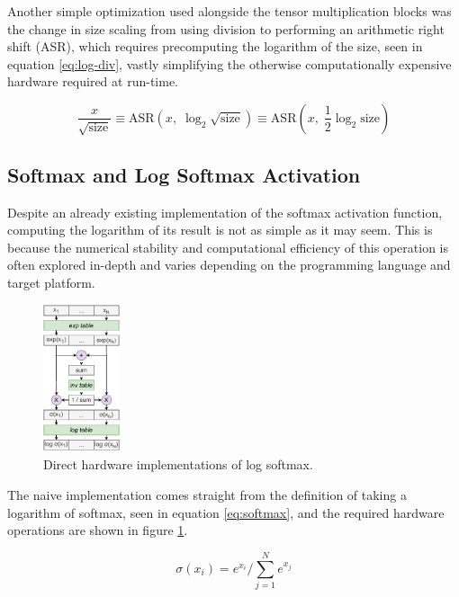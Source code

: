 Another simple optimization used alongside the tensor multiplication blocks was the change in size scaling from using division to performing an arithmetic right shift (ASR), which requires precomputing the logarithm of the size, seen in equation \ref{eq:log-div}, vastly simplifying the otherwise computationally expensive hardware required at run-time.

\begin{equation}\label{eq:log-div}
  \frac{x}{\sqrt{\text{size}}} \equiv \text{ASR}(x,\; \log_2 \sqrt{\text{size}}) \equiv \text{ASR}(x,\; \frac{1}{2}\log_2 \text{size})
\end{equation}


\subsection{Softmax and Log Softmax Activation}
Despite an already existing \hlsml implementation of the softmax activation function, computing the logarithm of its result is not as simple as it may seem. This is because the numerical stability and computational efficiency of this operation is often explored in-depth \cite{60-blanchard2019accurate} and varies depending on the programming language and target platform.

\begin{figure}[hpt!]
  \centering
  \includegraphics[trim={0cm 0cm 0cm 0cm}, width=0.2\textwidth, center]{models/log_softmax_naive.pdf}
  \caption{Direct hardware implementations of log softmax.}
  \label{fig:log-softmax-naive}
\end{figure}

The naive implementation comes straight from the definition of taking a logarithm of softmax, seen in equation \ref{eq:softmax}, and the required hardware operations are shown in figure \ref{fig:log-softmax-naive}.

\begin{equation} \label{eq:softmax}
    \sigma (x_i) = e^{x_i} / \sum_{j=1}^{N} e^{x_j}
\end{equation}

